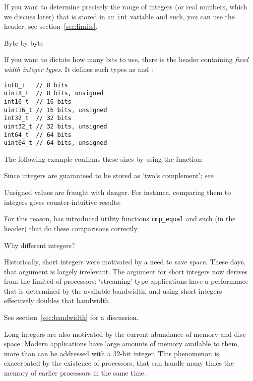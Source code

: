 If you want to determine precisely the range of
integers (or real numbers, which we discuss later)
that is stored in an \lstinline{int} variable and such,
you can use the  header; see section~\ref{sec:limits}.

 {Byte by byte}
\label{sec:unsigned-cmp}

If you want to dictate how many bits to use, there is
the  header
containing \emph{fixed width integer types}.
It defines such types
as  and :
\begin{lstlisting}
int8_t   // 8 bits
uint8_t  // 8 bits, unsigned
int16_t  // 16 bits
uint16_t // 16 bits, unsigned
int32_t  // 32 bits
uint32_t // 32 bits, unsigned
int64_t  // 64 bits
uint64_t // 64 bits, unsigned
\end{lstlisting}

The following example confirms these sizes by using the  function:
%

Since  integers are guaranteed to be stored as
`two's complement'; see .

Unsigned values are fraught with danger. For instance,
comparing them to integers gives counter-intuitive results:
%

For this reason,  has introduced utility functions
\lstinline+cmp_equal+ and such (in the  header)
that do these comparisons correctly.

 {Why different integers?}

Historically, short integers were motivated by a need to save space.
These days, that argument is largely irrelevant.
The argument for short integers now derives from
the limited  of processors:
`streaming' type applications
have a performance that is determined by the available bandwidth,
and using short integers effectively doubles that bandwidth.
\begin{packt}
  See section~\ref{sec:bandwidth} for a discussion.
\end{packt}

Long integers are also motivated by the current abundance of
memory and disc space.
Modern applications have
large amounts of memory available to them,
more than can be addressed with a 32-bit integer.
This phenomenon is exacerbated by the existence of
 processors, that can handle
many times the memory of earlier processors in the same time.

